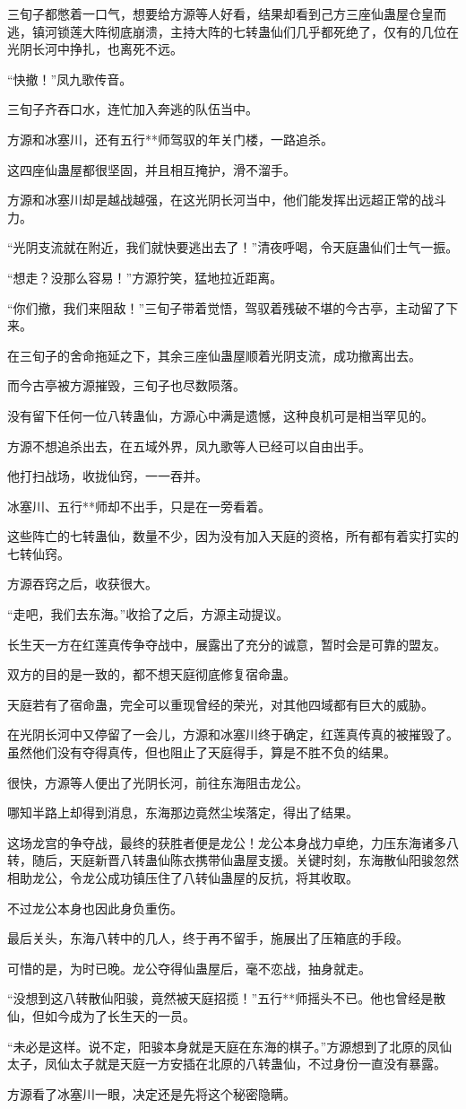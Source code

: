 \begin{this_body}
三旬子都憋着一口气，想要给方源等人好看，结果却看到己方三座仙蛊屋仓皇而逃，镇河锁莲大阵彻底崩溃，主持大阵的七转蛊仙们几乎都死绝了，仅有的几位在光阴长河中挣扎，也离死不远。

“快撤！”凤九歌传音。

三旬子齐吞口水，连忙加入奔逃的队伍当中。

方源和冰塞川，还有五行**师驾驭的年关门楼，一路追杀。

这四座仙蛊屋都很坚固，并且相互掩护，滑不溜手。

方源和冰塞川却是越战越强，在这光阴长河当中，他们能发挥出远超正常的战斗力。

“光阴支流就在附近，我们就快要逃出去了！”清夜呼喝，令天庭蛊仙们士气一振。

“想走？没那么容易！”方源狞笑，猛地拉近距离。

“你们撤，我们来阻敌！”三旬子带着觉悟，驾驭着残破不堪的今古亭，主动留了下来。

在三旬子的舍命拖延之下，其余三座仙蛊屋顺着光阴支流，成功撤离出去。

而今古亭被方源摧毁，三旬子也尽数陨落。

没有留下任何一位八转蛊仙，方源心中满是遗憾，这种良机可是相当罕见的。

方源不想追杀出去，在五域外界，凤九歌等人已经可以自由出手。

他打扫战场，收拢仙窍，一一吞并。

冰塞川、五行**师却不出手，只是在一旁看着。

这些阵亡的七转蛊仙，数量不少，因为没有加入天庭的资格，所有都有着实打实的七转仙窍。

方源吞窍之后，收获很大。

“走吧，我们去东海。”收拾了之后，方源主动提议。

长生天一方在红莲真传争夺战中，展露出了充分的诚意，暂时会是可靠的盟友。

双方的目的是一致的，都不想天庭彻底修复宿命蛊。

天庭若有了宿命蛊，完全可以重现曾经的荣光，对其他四域都有巨大的威胁。

在光阴长河中又停留了一会儿，方源和冰塞川终于确定，红莲真传真的被摧毁了。虽然他们没有夺得真传，但也阻止了天庭得手，算是不胜不负的结果。

很快，方源等人便出了光阴长河，前往东海阻击龙公。

哪知半路上却得到消息，东海那边竟然尘埃落定，得出了结果。

这场龙宫的争夺战，最终的获胜者便是龙公！龙公本身战力卓绝，力压东海诸多八转，随后，天庭新晋八转蛊仙陈衣携带仙蛊屋支援。关键时刻，东海散仙阳骏忽然相助龙公，令龙公成功镇压住了八转仙蛊屋的反抗，将其收取。

不过龙公本身也因此身负重伤。

最后关头，东海八转中的几人，终于再不留手，施展出了压箱底的手段。

可惜的是，为时已晚。龙公夺得仙蛊屋后，毫不恋战，抽身就走。

“没想到这八转散仙阳骏，竟然被天庭招揽！”五行**师摇头不已。他也曾经是散仙，但如今成为了长生天的一员。

“未必是这样。说不定，阳骏本身就是天庭在东海的棋子。”方源想到了北原的凤仙太子，凤仙太子就是天庭一方安插在北原的八转蛊仙，不过身份一直没有暴露。

方源看了冰塞川一眼，决定还是先将这个秘密隐瞒。

\end{this_body}

